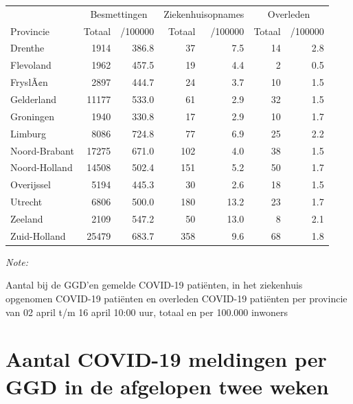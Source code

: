 \documentclass[
  english,
  man,floatsintext]{apa6}
\begin{document}
\begin{table}
\centering
\begin{threeparttable}
\begin{tabular}{lrrrrrr}
\toprule
\multicolumn{1}{c}{ } & \multicolumn{2}{c}{Besmettingen} & \multicolumn{2}{c}{Ziekenhuisopnames} & \multicolumn{2}{c}{Overleden} \\
\cmidrule(l{3pt}r{3pt}){2-3} \cmidrule(l{3pt}r{3pt}){4-5} \cmidrule(l{3pt}r{3pt}){6-7}
Provincie & Totaal & /100000 & Totaal & /100000 & Totaal & /100000\\
\midrule
Drenthe & 1914 & 386.8 & 37 & 7.5 & 14 & 2.8\\
Flevoland & 1962 & 457.5 & 19 & 4.4 & 2 & 0.5\\
FryslÃ¢n & 2897 & 444.7 & 24 & 3.7 & 10 & 1.5\\
Gelderland & 11177 & 533.0 & 61 & 2.9 & 32 & 1.5\\
Groningen & 1940 & 330.8 & 17 & 2.9 & 10 & 1.7\\
Limburg & 8086 & 724.8 & 77 & 6.9 & 25 & 2.2\\
Noord-Brabant & 17275 & 671.0 & 102 & 4.0 & 38 & 1.5\\
Noord-Holland & 14508 & 502.4 & 151 & 5.2 & 50 & 1.7\\
Overijssel & 5194 & 445.3 & 30 & 2.6 & 18 & 1.5\\
Utrecht & 6806 & 500.0 & 180 & 13.2 & 23 & 1.7\\
Zeeland & 2109 & 547.2 & 50 & 13.0 & 8 & 2.1\\
Zuid-Holland & 25479 & 683.7 & 358 & 9.6 & 68 & 1.8\\
\bottomrule
\end{tabular}
\begin{tablenotes}
\item \textit{Note: } 
\item Aantal bij de GGD’en gemelde COVID-19 patiënten, in het ziekenhuis opgenomen COVID-19 patiënten en overleden COVID-19 patiënten per provincie van 02 april t/m 16 april 10:00 uur, totaal en per 100.000 inwoners
\end{tablenotes}
\end{threeparttable}
\end{table}

\newpage

\hypertarget{aantal-covid-19-meldingen-per-ggd-in-de-afgelopen-twee-weken}{%
\section{Aantal COVID-19 meldingen per GGD in de afgelopen twee weken}\label{aantal-covid-19-meldingen-per-ggd-in-de-afgelopen-twee-weken}}
\end{document}
